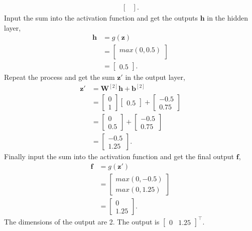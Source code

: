 \documentclass[10pt]{article}
\begin{document}
\begin{enumerate}[1)]
\begin{align*}
\begin{bmatrix}
  \end{bmatrix}.
\end{align*}
Input the sum into the activation function and get the outputs $\pmb{h}$ in the hidden layer,
\begin{align*}
\pmb{h}&=g(\pmb{z})\\
&=
  \begin{bmatrix}
    max(0,0.5)\\
  \end{bmatrix}\\
&=
  \begin{bmatrix}
    0.5
  \end{bmatrix}.
\end{align*}
Repeat the process and get the sum $\pmb{z}'$ in the output layer,
\begin{align*}
\pmb{z}'&=\pmb{W}^{[2]}\pmb{h}+\pmb{b}^{[2]}\\
&=
  \begin{bmatrix}
    0\\
    1
  \end{bmatrix}
  \begin{bmatrix}
    0.5
  \end{bmatrix}
+
  \begin{bmatrix}
    -0.5\\
    0.75
  \end{bmatrix}\\
&=
  \begin{bmatrix}
    0\\
    0.5
  \end{bmatrix}
+
  \begin{bmatrix}
    -0.5\\
    0.75
  \end{bmatrix}\\
&=
  \begin{bmatrix}
    -0.5\\
    1.25
  \end{bmatrix}.
\end{align*}
Finally input the sum into the activation function and get the final output $\pmb{f}$,
\begin{align*}
\pmb{f}&=g(\pmb{z}')\\
&=
  \begin{bmatrix}
    max(0,-0.5)\\
    max(0,1.25)
  \end{bmatrix}\\
&=
  \begin{bmatrix}
    0\\
    1.25
  \end{bmatrix}.
\end{align*}
The dimensions of the output are 2. The output is $
  \begin{bmatrix}
    0 & 1.25
  \end{bmatrix}
^{\top}$.\\


\end{enumerate}
\end{document}
